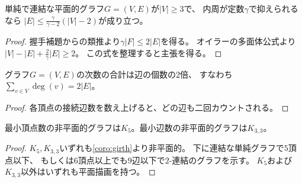 \begin{corollary}
\label{coro:girth}
単純で連結な平面的グラフ$G=(V, E)$が$|V|\geq 3$で、
内周が定数$\gamma$で抑えられるなら
$|E| \leq \frac{\gamma}{\gamma - 2}(|V| - 2)$が成り立つ。
\end{corollary}

\begin{proof}
握手補題からの類推より$\gamma |F| \leq 2|E|$を得る。
オイラーの多面体公式より$|V|-|E|+\frac{2}{\gamma}|E| \geq 2$。
この式を整理すると主張を得る。
\end{proof}

\begin{lemma}[握手補題]
グラフ$G=(V, E)$の次数の合計は辺の個数の$2$倍、
すなわち$\sum\limits_{v \in V}\deg(v)=2|E|$。
\end{lemma}
\vspace*{-0.7\intextsep}
\begin{proof}
各頂点の接続辺数を数え上げると、どの辺も二回カウントされる。
\end{proof}

\begin{corollary}
\label{coro:minimum_nonplanar}
最小頂点数の非平面的グラフは$K_5$。最小辺数の非平面的グラフは$K_{3,3}$。
\end{corollary}


\begin{proof}
$K_5, K_{3,3}$いずれも\cref{coro:girth}より非平面的。
下に連結な単純グラフで$5$頂点以下、
もしくは$6$頂点以上でも$9$辺以下で$2$-連結のグラフを示す。
$K_5$および$K_{3,3}$以外はいずれも平面描画を持つ。
\end{proof}

